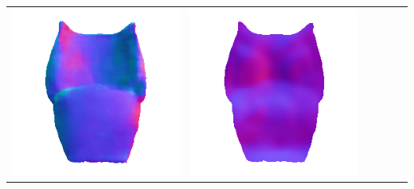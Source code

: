 \begin{tabularx}{\linewidth}{@{}Y@{}Y@{}Y@{}Y@{}Y@{}Y@{}}
\includegraphics[width=\linewidth]{semisynthetic/20150514_15_marrnet_out.png} &
\includegraphics[width=\linewidth]{semisynthetic/20150514_15_ef_out.png} \\

\end{tabularx}
